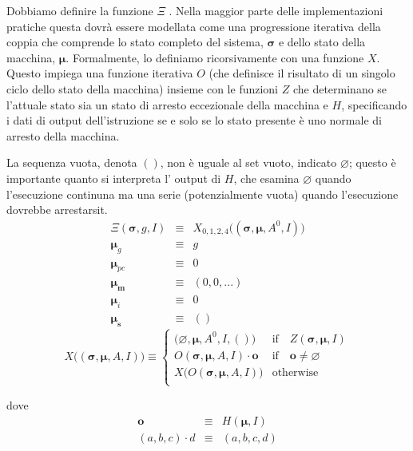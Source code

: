 \documentclass[9pt,oneside]{amsart}
\begin{document}
\begin{multicols}{2}
Dobbiamo definire la funzione $\Xi$ . Nella maggior parte delle implementazioni pratiche questa dovrà essere modellata come una progressione iterativa della coppia che comprende lo stato completo del sistema, $\boldsymbol{\sigma}$ e dello stato della macchina, $\boldsymbol{\mu}$. Formalmente, lo definiamo ricorsivamente con una funzione $X$. Questo impiega una funzione iterativa $O$ (che definisce il risultato di un singolo ciclo dello stato della macchina) insieme con le funzioni $Z$ che determinano se l'attuale stato sia un stato di arresto eccezionale della macchina e $H$, specificando i dati di output dell'istruzione se e solo se lo stato presente è uno normale di arresto della macchina.

La sequenza vuota, denota $()$, non è uguale al set vuoto, indicato $\varnothing$; questo è importante quanto si interpreta l' output di $H$, che esamina $\varnothing$ quando l'esecuzione continuna ma una serie (potenzialmente vuota) quando l'esecuzione dovrebbe arrestarsit.
\begin{eqnarray}
\Xi(\boldsymbol{\sigma}, g, I) & \equiv & X_{0,1,2,4}\big((\boldsymbol{\sigma}, \boldsymbol{\mu}, A^0, I)\big) \\
\boldsymbol{\mu}_g & \equiv & g \\
\boldsymbol{\mu}_{pc} & \equiv & 0 \\
\boldsymbol{\mu}_\mathbf{m} & \equiv & (0, 0, ...) \\
\boldsymbol{\mu}_i & \equiv & 0 \\
\boldsymbol{\mu}_\mathbf{s} & \equiv & ()
\end{eqnarray}
\begin{equation}
X\big( (\boldsymbol{\sigma}, \boldsymbol{\mu}, A, I) \big) \equiv \begin{cases}
\big(\varnothing, \boldsymbol{\mu}, A^0, I, ()\big) & \text{if} \quad Z(\boldsymbol{\sigma}, \boldsymbol{\mu}, I)\\
O(\boldsymbol{\sigma}, \boldsymbol{\mu}, A, I) \cdot \mathbf{o} & \text{if} \quad \mathbf{o} \neq \varnothing\\
X\big(O(\boldsymbol{\sigma}, \boldsymbol{\mu}, A, I)\big) & \text{otherwise}\\
\end{cases}
\end{equation}

dove
\begin{eqnarray}
\mathbf{o} & \equiv & H(\boldsymbol{\mu}, I) \\
(a, b, c) \cdot d & \equiv & (a, b, c, d)
\end{eqnarray}


\end{multicols}
\end{document}
